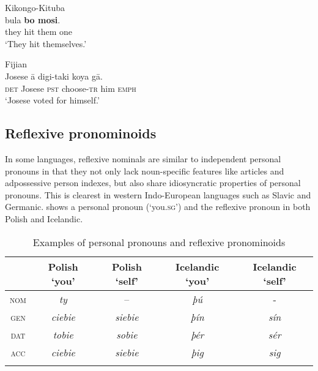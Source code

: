 \documentclass[output=paper]{langscibook}
\begin{document}
\ea Kikongo-Kituba  
    \label{ex:Haspelmath:28}\\
          {bula}  \textbf{{bo}  {mosi}}.\\
       they  hit  them  one \\
    \glt ‘They hit themselves.’ \citep{Mufwene2013}
\z

    
\ea%
    Fijian\label{ex:Haspelmath:29}\\
      {Josese}  {ā}  {digi-taki}  {koya}  {gā.}\\
      \textsc{det}  Josese  \textsc{pst}  choose-\textsc{tr}  him  \textsc{emph}   \\
    \glt‘Josese voted for himself.’ \citep[775]{Park2013}
\z


\subsection{Reflexive pronominoids}\label{sec:Haspelmath:6.5}
In some languages, reflexive nominals are similar to independent personal pronouns in that they not only lack noun-specific features like articles and adpossessive person indexes, but also share idiosyncratic properties of personal pronouns. This is clearest in western Indo-European languages such as Slavic and Germanic.  shows a personal pronoun (‘you.\textsc{sg’}) and the reflexive pronoun in both Polish and Icelandic.

\begin{table}
\begin{tabular}{ccccc}
\lsptoprule
    & Polish ‘you’ & Polish ‘self’ & Icelandic ‘you’ & Icelandic ‘self’ \\
    \hline 
\textsc{nom} & \textit{ty}           & –             & \textit{þú}              & -                \\
\textsc{gen} &\textit{ciebie}       & \textit{siebie}        & \textit{þín}             & \textit{sín}              \\
\textsc{dat} & \textit{tobie}        & \textit{sobie}         & \textit{þér}             & \textit{sér}              \\
\textsc{acc}& \textit{ciebie}       & \textit{siebie}        & \textit{þig}             & \textit{sig}       \\
\lspbottomrule
\end{tabular}
\caption{Examples of personal pronouns and reflexive pronominoids}\label{tab:Haspelmath:2}
\end{table}
\end{document}
